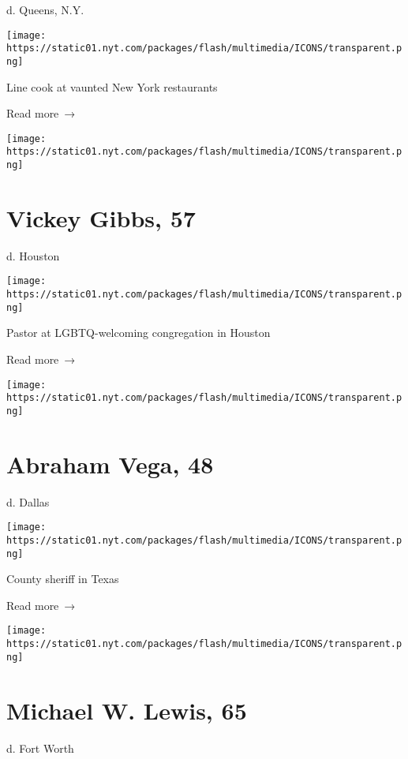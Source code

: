 d. Queens, N.Y.

\texttt{[image: https://static01.nyt.com/packages/flash/multimedia/ICONS/transparent.png]}

Line cook at vaunted New York restaurants

 Read more~→

\href{https://www.nytimes.com/2020/07/15/us/vickey-gibbs-dead-coronavirus.html}{}

\texttt{[image: https://static01.nyt.com/packages/flash/multimedia/ICONS/transparent.png]}

\hypertarget{vickey-gibbs-57}{%
\section{Vickey Gibbs, 57}\label{vickey-gibbs-57}}

d. Houston

\texttt{[image: https://static01.nyt.com/packages/flash/multimedia/ICONS/transparent.png]}

Pastor at LGBTQ-welcoming congregation in Houston

 Read more~→

\href{https://www.nytimes.com/2020/07/14/us/abraham-vega-dead-coronavirus.html}{}

\texttt{[image: https://static01.nyt.com/packages/flash/multimedia/ICONS/transparent.png]}

\hypertarget{abraham-vega-48}{%
\section{Abraham Vega, 48}\label{abraham-vega-48}}

d. Dallas

\texttt{[image: https://static01.nyt.com/packages/flash/multimedia/ICONS/transparent.png]}

County sheriff in Texas

 Read more~→

\href{https://www.nytimes.com/2020/07/13/obituaries/michael-lewis-dead-coronavirus.html}{}

\texttt{[image: https://static01.nyt.com/packages/flash/multimedia/ICONS/transparent.png]}

\hypertarget{michael-w-lewis-65}{%
\section{Michael W. Lewis, 65}\label{michael-w-lewis-65}}

d. Fort Worth

